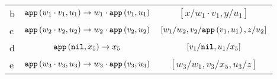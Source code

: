 \begin{example}
\begin{landscape}
\begin{table}[h!]
\begin{tabular}{l  c  c}
            b & $\mathtt{app}\left(w_1 \cdot v_1,u_1\right) \rightarrow w_1 \cdot \mathtt{app}\left(v_1,u_1\right)$ & $[x / w_1 \cdot v_1, y / u_1 ]$ \\

            c & $\mathtt{app}\left(w_2 \cdot v_2,u_2\right) \rightarrow w_2 \cdot \mathtt{app}\left(v_2,u_2\right)$ & $[w_1 / w_2, v_2 / \mathtt{app}\left(v_1,u_1\right), z / u_2]$ \\

            d & $\mathtt{app}\left(\mathtt{nil},x_5\right) \rightarrow x_5$ & $[v_1 / \mathtt{nil}, u_1 / x_5]$ \\

            e & $\mathtt{app}\left(w_3 \cdot v_3,u_3\right) \rightarrow w_3 \cdot \mathtt{app}\left(v_3,u_3\right)$ & $[w_3 / w_1, v_3 / x_5, u_3 / z]$ \\
            \hline
            \end{tabular}
        \end{table}
    \end{landscape}
\end{example}



